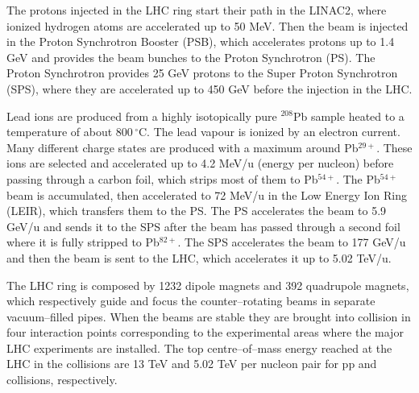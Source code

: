 The protons injected in the LHC ring start their path in the LINAC2, where ionized hydrogen
atoms are accelerated up to 50 MeV. Then the beam is injected in the Proton Synchrotron Booster 
(PSB), which accelerates protons up to 1.4 GeV and provides the beam bunches to the Proton 
Synchrotron (PS). The Proton Synchrotron provides 25 GeV protons to the Super Proton Synchrotron
(SPS), where they are accelerated up to 450 GeV before the injection in the LHC.

Lead ions are produced from a highly isotopically pure $^{208}$Pb sample heated to a temperature
of about $800\,^{\circ}\mathrm{C}$.
The lead vapour is ionized by an electron current. Many different charge states are produced
with a maximum around Pb$^{29+}$.
These ions are selected and accelerated up to 4.2 MeV/u (energy per nucleon) before passing through
a carbon foil, which strips most of them to Pb$^{54+}$. The Pb$^{54+}$ beam is accumulated, then
accelerated to 72 MeV/u in the Low Energy Ion Ring (LEIR), which transfers them to the PS.
The PS accelerates the beam to 5.9 GeV/u and sends it to the SPS after the beam has passed through a second foil where it is fully stripped to Pb$^{82+}$. 
The SPS accelerates the beam to 177 GeV/u and then the beam is sent to the LHC, which accelerates it
up to 5.02 TeV/u.

The LHC ring is composed by 1232 dipole magnets and 392 quadrupole magnets, which respectively 
guide and focus the counter–rotating beams in separate vacuum–filled pipes.
When the beams are stable they are brought into collision in four interaction points corresponding
to the experimental areas where the major LHC experiments are installed.
The top centre–of–mass energy reached at the LHC in the collisions are 13 TeV and 5.02 TeV per 
nucleon pair for pp and \pPb collisions, respectively.

